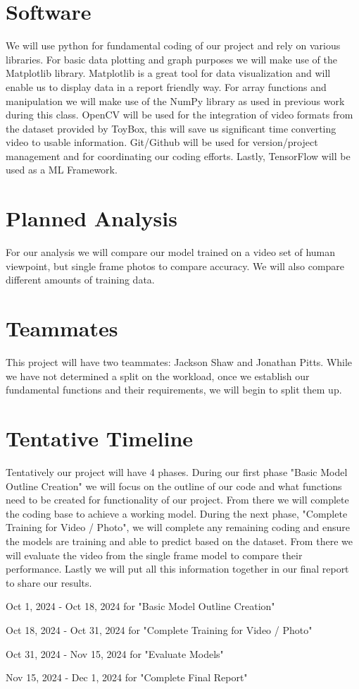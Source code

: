 \documentclass{article}
\begin{document}
\section{Software}


We will use python for fundamental coding of our project and rely on various libraries. For basic data plotting and graph purposes we will make use of the Matplotlib library. Matplotlib is a great tool for data visualization and will enable us to display data in a report friendly way. For array functions and manipulation we will make use of the NumPy library as used in previous work during this class.  OpenCV will be used for the integration of video formats from the dataset provided by ToyBox, this will save us significant time converting video to usable information. Git/Github will be used for version/project management and for coordinating our coding efforts. Lastly, TensorFlow will be used as a ML Framework.


\section{Planned Analysis}

For our analysis we will compare our model trained on a video set of human viewpoint, but single frame photos to compare accuracy.  We will also compare different amounts of training data. 


\section{Teammates}

This project will have two teammates: Jackson Shaw and Jonathan Pitts. While we have not determined a split on the workload, once we establish our fundamental functions and their requirements, we will begin to split them up. 


\section{Tentative Timeline}

Tentatively our project will have 4 phases. During our first phase "Basic Model Outline Creation" we will focus on the outline of our code and what functions need to be created for functionality of our project. From there we will complete the coding base to achieve a working model. During the next phase, "Complete Training for Video / Photo", we will complete any remaining coding and ensure the models are training and able to predict based on the dataset. From there we will evaluate the video from the single frame model to compare their performance. Lastly we will put all this information together in our final report to share our results.

Oct 1, 2024 - Oct 18, 2024 for "Basic Model Outline Creation"

Oct 18, 2024 - Oct 31, 2024 for "Complete Training for Video / Photo"

Oct 31, 2024 - Nov 15, 2024 for "Evaluate Models"

Nov 15, 2024 - Dec 1, 2024 for "Complete Final Report"
\end{document}
